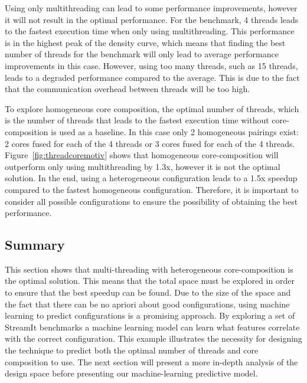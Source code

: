 Using only multithreading can lead to some performance improvements, however it will not result in the optimal performance.
For the  benchmark, 4 threads leads to the fastest execution time when only using multithreading.
This performance is in the highest peak of the density curve, which means that finding the best number of threads for the benchmark will only lead to average performance improvements in this case.
However, using too many threads, such as 15 threads, leads to a degraded performance compared to the average.
This is due to the fact that the communication overhead between threads will be too high.

To explore homogeneous core composition, the optimal number of threads, which is the number of threads that leads to the fastest execution time without core-composition is used as a baseline.
In this case only 2 homogeneous pairings exist: 2 cores fused for each of the 4 threads or 3 cores fused for each of the 4 threads.
Figure~\ref{fig:threadcoremotiv} shows that homogeneous core-composition will outperform only using multithreading by 1.3x, however it is not the optimal solution.
In the end, using a heterogeneous configuration leads to a 1.5x speedup compared to the fastest homogeneous configuration.
Therefore, it is important to consider all possible configurations to ensure the possibility of obtaining the best performance.

\subsection{Summary}
This section shows that multi-threading with heterogeneous core-composition is the optimal solution.
This means that the total space must be explored in order to ensure that the best speedup can be found.
Due to the size of the space and the fact that there can be no apriori about good configurations, using machine learning to predict configurations is a promising approach. %
By exploring a set of StreamIt benchmarks a machine learning model can learn what features correlate with the correct configuration.
This example illustrates the necessity for designing the technique to predict both the optimal number of threads and core composition to use.
The next section will present a more in-depth analysis of the design space before presenting our machine-learning predictive model.
